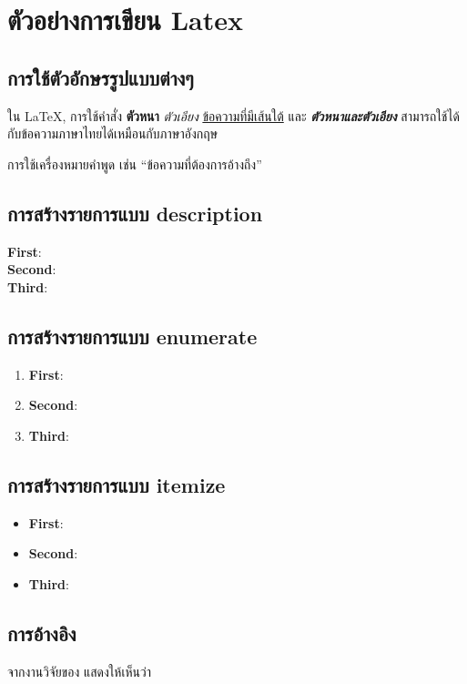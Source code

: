 \section*{ตัวอย่างการเขียน Latex}
\subsection*{การใช้ตัวอักษรรูปแบบต่างๆ}

ใน LaTeX, การใช้คำสั่ง \textbf{ตัวหนา} \textit{ตัวเอียง} \underline{ข้อความที่มีเส้นใต้} และ \textbf{\textit{ตัวหนาและตัวเอียง}} สามารถใช้ได้กับข้อความภาษาไทยได้เหมือนกับภาษาอังกฤษ

การใช้เครื่องหมายคำพูด เช่น ``ข้อความที่ต้องการอ้างถึง''

\subsection*{การสร้างรายการแบบ description}
\begin{description}
\item[\textbf{First}:] \dotfill
\item[\textbf{Second}:] \dotfill
\item[\textbf{Third}:] \dotfill
\end{description}

\subsection*{การสร้างรายการแบบ enumerate}
\begin{enumerate}
\item \textbf{First}: \dotfill
\item \textbf{Second}: \dotfill
\item \textbf{Third}: \dotfill
\end{enumerate}

\subsection*{การสร้างรายการแบบ itemize}
\begin{itemize}
\item \textbf{First}: \dotfill
\item \textbf{Second}: \dotfill
\item \textbf{Third}: \dotfill
\end{itemize}

\subsection*{การอ้างอิง}
\dotfill 
จากงานวิจัยของ \cite{musikawan2022enhanced,kongsorot2023intrusion} แสดงให้เห็นว่า \dotfill

